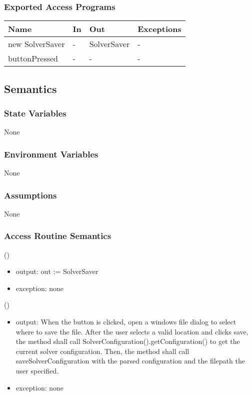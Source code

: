 \documentclass[12pt, titlepage]{article}
\begin{document}
\subsubsection{Exported Access Programs}
\begin{center}
\begin{tabular}{p{5cm} p{2cm} p{4cm} p{5.5cm}}
\hline
\textbf{Name} & \textbf{In} & \textbf{Out} & \textbf{Exceptions} \\
\hline
new SolverSaver & - & SolverSaver & - \\
\hline
buttonPressed & - & - & - \\
\hline
\end{tabular}
\end{center}

\subsection{Semantics}

\subsubsection{State Variables}
None
\subsubsection{Environment Variables}
None
\subsubsection{Assumptions}
None
\subsubsection{Access Routine Semantics}

()
\begin{itemize}  
\item output: out :=  SolverSaver
\item exception: none
\end{itemize}

()
\begin{itemize}
\item output: When the button is clicked, open a windows file dialog to select where to save the file. After the user selects a valid location and clicks save, the method shall call SolverConfiguration().getConfiguration() to get the current solver configuration. Then, the method shall call saveSolverConfiguration with the parsed configuration and the filepath the user specified.
\item exception: none
\end{itemize}
\end{document}
